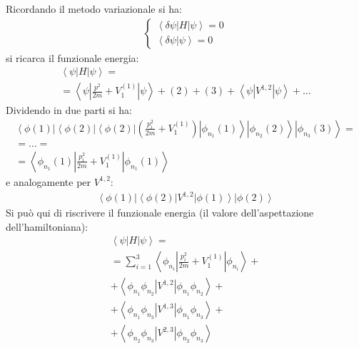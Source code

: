Ricordando il metodo variazionale si ha:
\begin{equation}\begin{split}
\begin{cases}
\left\langle \delta\psi |H|\psi  \right\rangle=0\\
\left\langle \delta\psi |\psi  \right\rangle=0
\end{cases}
\end{split}\end{equation}
si ricarca il funzionale energia:
\begin{equation}\begin{split}
\left\langle \psi |H|\psi  \right\rangle=\\
=\left\langle \psi |\frac{p^2}{2m}+V_1^{\left(1\right)}|\psi  \right\rangle+\left(2\right)+\left(3\right)+\left\langle \psi |V^{1,2}|\psi  \right\rangle+\dots
\end{split}\end{equation}
Dividendo in due parti si ha:
\begin{equation}\begin{split}
\left\langle \phi\left(1\right)\right |\left\langle \phi\left(2\right) \right |\left\langle \phi\left(2\right)\right |\left(\frac{p^2_i}{2m}+V_1^{\left(1\right)}\right)\left |\phi_{n_1}\left(1\right) \right\rangle\left |\phi_{n_2}\left(2\right) \right\rangle\left |\phi_{n_3}\left(3\right) \right\rangle=\\
=\dots=\\
=\left\langle \phi_{n_1}\left(1\right)|\frac{p^2_i}{2m}+V_1^{\left(1\right)}|\phi_{n_1}\left(1\right) \right\rangle
\end{split}\end{equation}
e analogamente per $V^{1,2}$:
\begin{equation}\begin{split}
\left\langle \phi\left(1\right)\right |\left\langle \phi\left(2\right)\right |V^{1,2}\left |\phi\left(1\right) \right\rangle\left |\phi\left(2\right) \right\rangle
\end{split}\end{equation}
Si può qui di riscrivere il funzionale energia (il valore dell'aspettazione dell'hamiltoniana):
\begin{equation}\begin{split}
\left\langle \psi |H|\psi  \right\rangle=\\
=\sum_{i=1}^{3}{\left\langle \phi_{n_i}|\frac{p^2_i}{2m}+V_1^{\left(1\right)}|\phi_{n_i} \right\rangle}+\\
+\left\langle \phi_{n_1}\phi_{n_2}|V^{1,2}|\phi_{n_1}\phi_{n_2} \right\rangle+\\
+\left\langle \phi_{n_1}\phi_{n_3}|V^{1,3}|\phi_{n_1}\phi_{n_3} \right\rangle+\\
+\left\langle \phi_{n_2}\phi_{n_3}|V^{2,3}|\phi_{n_2}\phi_{n_3} \right\rangle
\end{split}\end{equation}

